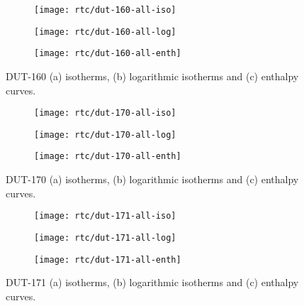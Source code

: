 \begin{figure}[H]
    \centering
    \begin{subfigure}{0.33\linewidth}
        \texttt{[image: rtc/dut-160-all-iso]}%
        \caption{}
    \end{subfigure}%
    \begin{subfigure}{0.33\linewidth}
        \texttt{[image: rtc/dut-160-all-log]}%
        \caption{}
    \end{subfigure}%
    \begin{subfigure}{0.33\linewidth}
        \texttt{[image: rtc/dut-160-all-enth]}%
        \caption{}
    \end{subfigure}%
    \caption{DUT-160 (a) isotherms, (b) logarithmic isotherms and 
    (c) enthalpy curves.}%
    \label{appx:dut:fgr:dut-160-butane-rtc}
\end{figure}

\begin{figure}[H]
    \centering
    \begin{subfigure}{0.33\linewidth}
        \texttt{[image: rtc/dut-170-all-iso]}%
        \caption{}
    \end{subfigure}%
    \begin{subfigure}{0.33\linewidth}
        \texttt{[image: rtc/dut-170-all-log]}%
        \caption{}
    \end{subfigure}%
    \begin{subfigure}{0.33\linewidth}
        \texttt{[image: rtc/dut-170-all-enth]}%
        \caption{}
    \end{subfigure}%
    \caption{DUT-170 (a) isotherms, (b) logarithmic isotherms and 
    (c) enthalpy curves.}%
    \label{appx:dut:fgr:dut-170-butane-rtc}
\end{figure}

\begin{figure}[H]
    \centering
    \begin{subfigure}{0.33\linewidth}
        \texttt{[image: rtc/dut-171-all-iso]}%
        \caption{}
    \end{subfigure}%
    \begin{subfigure}{0.33\linewidth}
        \texttt{[image: rtc/dut-171-all-log]}%
        \caption{}
    \end{subfigure}%
    \begin{subfigure}{0.33\linewidth}
        \texttt{[image: rtc/dut-171-all-enth]}%
        \caption{}
    \end{subfigure}%
    \caption{DUT-171 (a) isotherms, (b) logarithmic isotherms and 
    (c) enthalpy curves.}%
    \label{appx:dut:fgr:dut-171-butane-rtc}
\end{figure}


